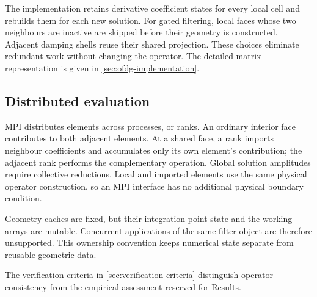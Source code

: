 The implementation retains derivative coefficient states for every local
cell and rebuilds them for each new solution. For gated filtering, local faces
whose two neighbours are inactive are skipped before their geometry is
constructed. Adjacent damping shells reuse their shared projection. These
choices eliminate redundant work without changing the operator. The detailed
matrix representation is given in \cref{sec:ofdg-implementation}.

\subsection{Distributed evaluation}
MPI distributes elements across processes, or ranks. An ordinary interior
face contributes to both adjacent elements. At a shared face, a rank imports
neighbour coefficients and accumulates only its own element's contribution;
the adjacent rank performs the complementary operation. Global solution
amplitudes require collective reductions. Local and imported elements use the
same physical operator construction, so an MPI interface has no additional
physical boundary condition.

Geometry caches are fixed, but their integration-point state and the working
arrays are mutable. Concurrent applications of the same filter object are
therefore unsupported. This ownership convention keeps numerical state
separate from reusable geometric data.

The verification criteria in \cref{sec:verification-criteria} distinguish
operator consistency from the empirical assessment reserved for Results.
